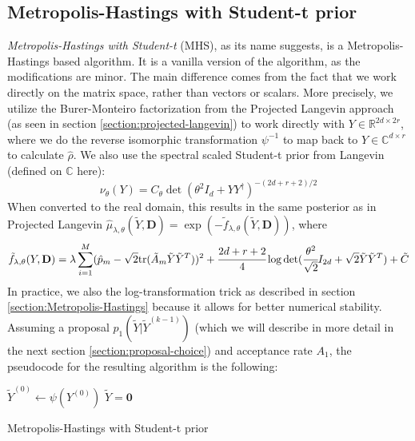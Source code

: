 \documentclass[12pt]{memoir}
\newcommand{\tr}{\text{tr}}
\newcommand{\mb}{\mathbf}
\begin{document}
\subsection*{Metropolis-Hastings with Student-t prior}
\textit{Metropolis-Hastings with Student-t} (MHS), as its name suggests, is a Metropolis-Hastings based algorithm. It is a vanilla version of the algorithm, as the modifications are minor. The main difference comes from the fact that we work directly on the matrix space, rather than vectors or scalars. More precisely, we utilize the Burer-Monteiro factorization from the Projected Langevin approach (as seen in section \ref{section:projected-langevin}) to work directly with $Y \in \mathbb{R}^{2d \times 2r}$, where we do the reverse isomorphic transformation $\psi^{-1}$ to map back to $Y \in \mathbb{C}^{d\times r}$ to calculate $\hat \rho$. We also use the spectral scaled Student-t prior from Langevin (defined on $\mathbb{C}$ here):
\begin{equation}
    \nu_{\theta} (Y) = C_\theta \det(\theta^2I_d + YY^\dagger)^{-(2d+r+2)/2}
\end{equation}
When converted to the real domain, this results in the same posterior as in Projected Langevin $\hat \mu_{\lambda, \theta}(\tilde Y, \mb D) =\exp(-\tilde f_{\lambda, \theta}(\tilde Y, \mb D))$, where 
\begin{equation}
    \tilde f_{\lambda, \theta}(Y, \mb D) = \lambda \sum^{M}_{i=1} (\hat p_m - \sqrt{2}\tr(\tilde A_m \tilde Y \tilde Y^{T}))^2 + \cfrac{2d + r + 2}{4}\log \det(\cfrac{\theta^2}{\sqrt 2}I_{2d} + \sqrt 2 \tilde Y \tilde Y^{T}) + \tilde C
\end{equation}
In practice, we also the log-transformation trick as described in section \ref{section:Metropolis-Hastings} because it allows for better numerical stability. Assuming a proposal $p_1(\tilde Y|\tilde Y^{(k-1)})$ (which we will describe in more detail in the next section \ref{section:proposal-choice}) and acceptance rate $A_1$, the pseudocode for the resulting algorithm is the following:\medbreak

\begin{algorithm}[H]
    \DontPrintSemicolon

    $\tilde Y^{(0)} \gets \psi(Y^{(0)})$\;
    $\tilde Y = \mb 0$\;
    \caption{Metropolis-Hastings with Student-t prior}
\end{algorithm}\medbreak
\end{document}
